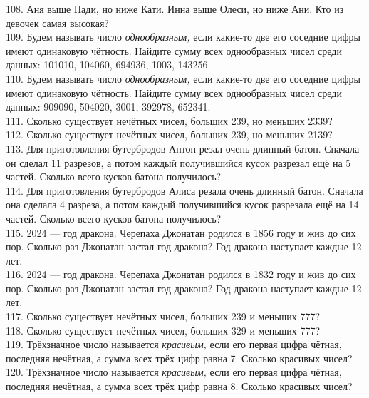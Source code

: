 \documentclass[12pt]{article}
\begin{document}
108. Аня выше Нади, но ниже Кати. Инна выше Олеси, но ниже Ани. Кто из девочек самая высокая?\\
109. Будем называть число {\it однообразным,} если какие-то две его соседние цифры имеют одинаковую чётность. Найдите сумму всех однообразных чисел среди данных: 101010, 104060, 694936, 1003, 143256.\\
110. Будем называть число {\it однообразным,} если какие-то две его соседние цифры имеют одинаковую чётность. Найдите сумму всех однообразных чисел среди данных: 909090, 504020, 3001, 392978, 652341.\\
111. Сколько существует нечётных чисел, больших 239, но меньших 2339?\\
112. Сколько существует нечётных чисел, больших 239, но меньших 2139?\\
113. Для приготовления бутербродов Антон резал очень длинный батон. Сначала он сделал 11 разрезов, а потом каждый получившийся кусок разрезал ещё на 5 частей. Сколько всего кусков батона получилось?\\
114. Для приготовления бутербродов Алиса резала очень длинный батон. Сначала она сделала 4 разреза, а потом каждый получившийся кусок разрезала ещё на 14 частей. Сколько всего кусков батона получилось?\\
115. 2024 --- год дракона. Черепаха Джонатан родился в 1856 году и жив до сих пор. Сколько раз Джонатан застал год дракона? Год дракона наступает каждые 12 лет.\\
116. 2024 --- год дракона. Черепаха Джонатан родился в 1832 году и жив до сих пор. Сколько раз Джонатан застал год дракона? Год дракона наступает каждые 12 лет.\\
117. Сколько существует нечётных чисел, больших 239 и меньших 777?\\
118. Сколько существует нечётных чисел, больших 329 и меньших 777?\\
119. Трёхзначное число называется {\it красивым,} если его первая цифра чётная, последняя нечётная, а сумма всех трёх цифр равна 7. Сколько красивых чисел?\\
120. Трёхзначное число называется {\it красивым,} если его первая цифра чётная, последняя нечётная, а сумма всех трёх цифр равна 8. Сколько красивых чисел?
\newpage
\end{document}
